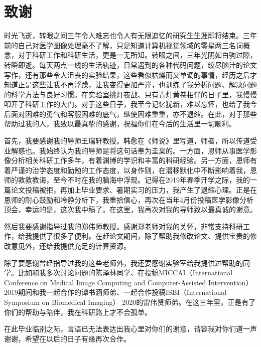 \chapter{致谢}


时光飞逝，转眼之间三年令人难忘也令人有无限追忆的研究生生涯即将结束。三年前的自己对医学图像处理毫不了解，只是知道计算机视觉领域的零星两三名词概念，对于科研工作和科研生活，更是一无所知。转眼之间，三年光阴如白驹过隙，转瞬即逝。每天两点一线的生活轨迹，日常遇到的各种代码问题，绞尽脑汁的论文写作，还有那些令人沮丧的实验结果，这些看似枯燥而又单调的事情，经历之后才知道正是这些让我不再浮躁，让我变得更加严谨，也训练了我分析问题、解决问题的科学方法与良好习惯。在实验室挑灯夜战、只有青灯黄卷相伴的日子里，我慢慢叩开了科研工作的大门。对于这些日子，我至今记忆犹新，难以忘怀，也给了我今后面对困难的勇气和客服困难的底气，纵使困难重重，亦不退缩。在此，对于那些帮助过我的人，我致以最真挚的感谢，祝福你们在今后的生活里一切顺利。

首先，我要感谢我的导师王瑞轩教授。韩愈在《师说》里写道，师者，所以传道受业解惑也。我始终认为我的导师是将这句话奉为圭臬的。一方面，恩师从事医学影像分析相关科研工作多年，有着渊博的学识和丰富的科研经验。另一方面，恩师有着严谨的治学态度和勤勉的工作态度，以身作则，在潜移默化中不断影响着我，恩师的敦敦教诲，至今不时在我的脑海中浮现。记得在2019年春季开学之际，我的一篇论文投稿被拒，再加上毕业要求、暑期实习的压力，我产生了退缩心理。正是在恩师的耐心鼓励和冷静分析下，我重拾信心，再次在当年4月份投稿医学影像分析顶会，幸运的是，这次我中稿了。在这里，我再次对我的导师致以最真诚的谢意。

然后我要感谢指导过我的郑伟师教授。感谢郑老师对我的关怀，非常支持科研工作，给我提供了很多了便利。在赶论文期间，除了帮助我修改论文、提供宝贵的修改意见外，还给我提供充足的计算资源。

除了要感谢曾经指导过我的这些老师外，我还要感谢实验室给我提供过帮助的同学。比如和我多次讨论问题的陈泽林同学、在投稿MICCAI（International Conference on Medical Image Computing and Computer-Assisted Intervention） 2019期间和我一起合作的谭书涵师弟、一起合作投稿ISBI（International Symposium on Biomedical Imaging） 2020的雷伟贤师弟。在这三年里，正是有了你们的帮助与陪伴，我在科研路上才不会孤单。

在此毕业临别之际，言语已无法表达出我心里对你们的谢意，请容我对你们道一声谢谢，希望在以后的日子有缘再次合作。



